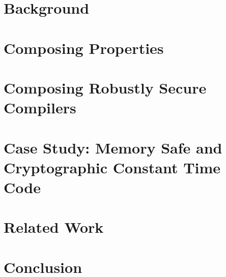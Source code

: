 \documentclass[acmsmall,review,screen,dvipsnames]{acmart}
\begin{document}
\section{Background}\label{sec:background}
\section{Composing Properties}\label{sec:compprop}
\section{Composing Robustly Secure Compilers}\label{sec:compcomp}
\section{Case Study: Memory Safe and Cryptographic Constant Time Code}\label{sec:casestud}



\section{Related Work}\label{sec:relwork}
\section{Conclusion}\label{sec:concl}


\begin{acks}
\end{acks}




\appendix
\end{document}
